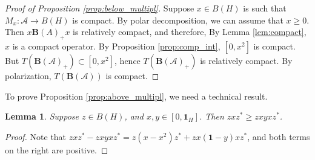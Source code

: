 \documentclass[12pt]{amsart}
\theoremstyle{plain}
\newtheorem{lemma}[theorem]{Lemma}
\theoremstyle{definition}
\renewcommand{\geq}{\geqslant}\usepackage{amssymb}
\newcommand{\one}{\mathbf{1}}
\newcommand{\ball}{\mathbf{B}}
\newcommand{\A}{\mathcal{A}}
\begin{document}
\begin{proof}[Proof of Proposition \ref{prop:below_multipl}]
Suppose $x \in B(H)$ is such that $M_x : \A \to B(H)$ is compact.
By polar decomposition, we can assume that $x \geq 0$.
Then $x \ball(A)_+ x$ is relatively compact, and therefore,
By Lemma \ref{lem:compact}, $x$ is a compact operator.
By Proposition \ref{prop:comp_int}, $[0, x^2]$ is compact.
But $T(\ball(\A)_+) \subset [0,x^2]$, hence $T(\ball(\A)_+)$
is relatively compact. By polarization, $T(\ball(\A))$ is compact.
\end{proof}

To prove Proposition \ref{prop:above_multipl}, we need a technical result.

\begin{lemma}\label{lem:comparison}
Suppose $z \in B(H)$, and $x, y \in [0, \one_H]$. Then
$z x z^* \geq zxyxz^*$.
\end{lemma}

\begin{proof}
Note that $z x z^* - z x y x z^* = z (x - x^2) z^* + z x (\one - y) x z^*$,
and both terms on the right are positive.
\end{proof}
\end{document}
